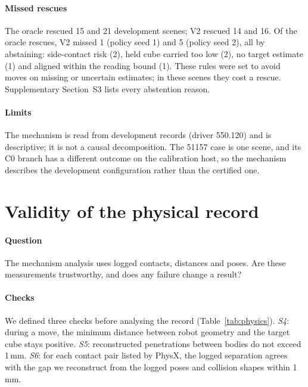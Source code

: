\documentclass[preprint,12pt]{elsarticle}
\newcommand{\tabdir}{}
\begin{document}
\paragraph{Missed rescues} The oracle rescued 15 and 21 development scenes; V2 rescued 14 and 16. Of the oracle rescues, V2 missed 1 (policy seed 1) and 5 (policy seed 2), all by abstaining: side-contact risk (2), held cube carried too low (2), no target estimate (1) and aligned within the reading bound (1). These rules were set to avoid moves on missing or uncertain estimates; in these scenes they cost a rescue. Supplementary Section~S3 lists every abstention reason.

\paragraph{Limits} The mechanism is read from development records (driver 550.120) and is descriptive; it is not a causal decomposition. The 51157 case is one scene, and its C0 branch has a different outcome on the calibration host, so the mechanism describes the development configuration rather than the certified one.

\section{Validity of the physical record}\label{sec:physics}

\paragraph{Question} The mechanism analysis uses logged contacts, distances and poses. Are these measurements trustworthy, and does any failure change a result?

\begin{table}[!htbp]
\centering\footnotesize
\caption{Measurement-validity checks on the development record (post hoc unless stated). S4--S6 were declared before the analysis; their official status is kept.}\label{tab:physics}

\end{table}

\paragraph{Checks} We defined three checks before analysing the record (Table~\ref{tab:physics}). \emph{S4}: during a move, the minimum distance between robot geometry and the target cube stays positive. \emph{S5}: reconstructed penetrations between bodies do not exceed 1\,mm. \emph{S6}: for each contact pair listed by PhysX, the logged separation agrees with the gap we reconstruct from the logged poses and collision shapes within 1\,mm.
\end{document}
